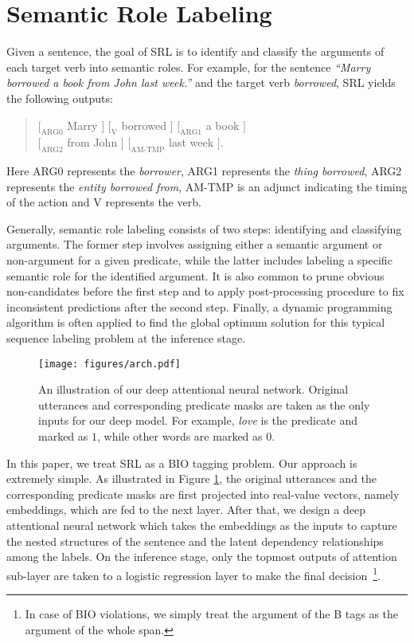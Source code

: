 \documentclass[letterpaper]{article} \usepackage{aaai18}  \usepackage{times}  \usepackage{helvet}  \usepackage{courier}  \usepackage{url}  \usepackage{graphicx}  \frenchspacing  \setlength{\pdfpagewidth}{8.5in}  \setlength{\pdfpageheight}{11in}  \usepackage{latexsym}
\begin{document}
\section{Semantic Role Labeling}
Given a sentence, the goal of SRL is to identify and classify the arguments of each target verb into semantic roles. For example, for the sentence \textit{``Marry borrowed a book from John last week.''} and the target verb \textit{borrowed}, SRL yields the following outputs:

\begin{verse}
$[_{\textrm{ARG0}}$  Marry $] $
$[_{\textrm{V}}$  borrowed $] $
$[_{\textrm{ARG1}}$ a book $]  $ \\
$[_{\textrm{ARG2}}$ from John $] $
$[_{\textrm{AM-TMP}}$  last week $]. $
\end{verse}

Here ARG0 represents the \textit{borrower}, ARG1 represents the \textit{thing borrowed}, ARG2 represents the \textit{entity borrowed from}, AM-TMP is an adjunct indicating the timing of the action and V represents the verb.

Generally, semantic role labeling consists of two steps: identifying and classifying arguments. The former step involves assigning either a semantic argument or non-argument for a given predicate, while the latter includes labeling a specific semantic role for the identified argument. It is also common to prune obvious non-candidates before the first step and to apply post-processing procedure to fix inconsistent predictions after the second step. Finally, a dynamic programming algorithm is often applied to find the global optimum solution for this typical sequence labeling problem at the inference stage.

\begin{figure}[!ht]
\begin{center}
  \texttt{[image: figures/arch.pdf]}
\end{center}
\caption{An illustration of our deep attentional neural network. Original utterances and corresponding predicate masks are taken as the only inputs for our deep model. For example, \textit{love} is the predicate and marked as $1$, while other words are marked as $0$.}
\label{f:overall}
\end{figure}

In this paper, we treat SRL as a BIO tagging problem. Our approach is extremely simple. As illustrated in Figure \ref{f:overall}, the original utterances and the corresponding predicate masks are first projected into real-value vectors, namely embeddings, which are fed to the next layer. After that, we design a deep attentional neural network which takes the embeddings as the inputs to capture the nested structures of the sentence and the latent dependency relationships among the labels. On the inference stage, only the topmost outputs of attention sub-layer are taken to a logistic regression layer to make the final decision~\footnote{In case of BIO violations, we simply treat the argument of the B tags as the argument of the whole span.}.
\end{document}
